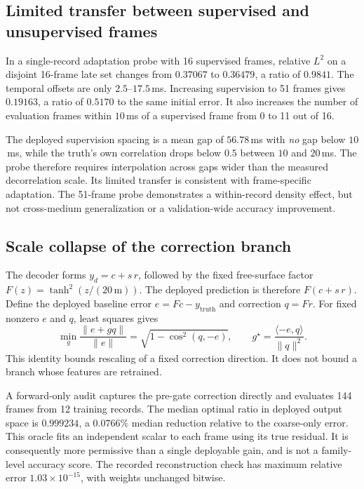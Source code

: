 \documentclass[11pt,a4paper]{article}
\begin{document}
\subsection{Limited transfer between supervised and unsupervised frames}

In a single-record adaptation probe with 16 supervised frames, relative $L^2$ on a disjoint
16-frame late set changes from $0.37067$ to $0.36479$, a ratio of $0.9841$.
The temporal offsets are only $2.5$--$17.5$\,ms. Increasing supervision to 51 frames gives
$0.19163$, a ratio of $0.5170$ to the same initial error. It also increases the number of
evaluation frames within $10$\,ms of a supervised frame from 0 to 11 out of 16.

The deployed supervision spacing is a mean gap of $56.78$\,ms with \emph{no} gap below
$10$\,ms, while the truth's own correlation drops below $0.5$ between $10$ and $20$\,ms. The
probe therefore requires interpolation across gaps wider than the measured decorrelation
scale. Its limited transfer is consistent with frame-specific adaptation. The 51-frame probe
demonstrates a within-record density effect, but not cross-medium generalization or a
validation-wide accuracy improvement.

\subsection{Scale collapse of the correction branch}
\label{sec:orth}

The decoder forms $y_d=c+s\,r$, followed by the fixed free-surface factor
$F(z)=\tanh^2(z/(20\,\mathrm{m}))$. The deployed prediction is therefore $F(c+s\,r)$.
Define the deployed baseline error $e=Fc-y_{\mathrm{truth}}$ and correction $q=Fr$.
For fixed nonzero $e$ and $q$, least squares gives
\begin{equation}
\label{eq:orth}
\min_g \frac{\lVert e+gq\rVert}{\lVert e\rVert}
=\sqrt{1-\cos^2(q,-e)},\qquad
 g^\star=\frac{\langle-e,q\rangle}{\lVert q\rVert^2}.
\end{equation}
This identity bounds rescaling of a fixed correction direction. It does not bound a branch
whose features are retrained.

A forward-only audit captures the pre-gate correction directly and evaluates 144 frames
from 12 training records. The median optimal ratio in deployed output space is $0.999234$,
a $0.0766\%$ median reduction relative to the coarse-only error. This oracle fits an independent
scalar to each frame using its true residual. It is consequently more permissive than a
single deployable gain, and is not a family-level accuracy score. The recorded reconstruction
check has maximum relative error $1.03\times10^{-15}$, with weights unchanged bitwise.
\end{document}
